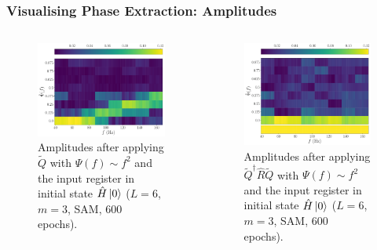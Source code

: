 \documentclass{beamer}
\begin{document}
\begin{frame}
\frametitle{Visualising Phase Extraction: Amplitudes}
\begin{columns}
\begin{column}{0.5\textwidth}
\begin{figure}
\centering 
\includegraphics[width=\textwidth]{im/Q_amp_quadratic_H}
\caption{Amplitudes after applying $\tilde{Q}$ with $\Psi(f) \sim f^2$ and the input register in initial state $\hat{H} \ket{0}$ ($L=6$, $m=3$, SAM, 600 epochs). }
\end{figure}
\end{column}
\begin{column}{0.5\textwidth}
\begin{figure}
\centering 
\includegraphics[width=\textwidth]{im/QRQ_amp_quadratic_H}
\caption{Amplitudes after applying $\tilde{Q}^\dagger \hat{R} \tilde{Q}$ with $\Psi(f) \sim f^2$ and the input register in initial state $\hat{H} \ket{0}$ ($L=6$, $m=3$, SAM, 600 epochs). }
\end{figure}
\end{column}
\end{columns}
\end{frame}
\end{document}
